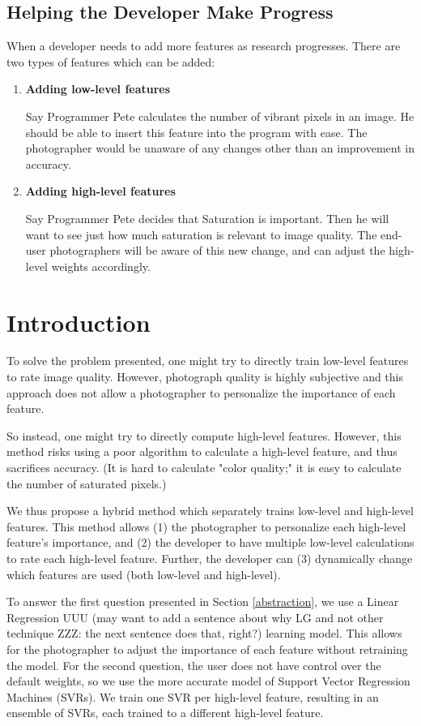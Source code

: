 \documentclass[11pt,letter]{article}
\begin{document}
\subsection{Helping the Developer Make Progress}
\label{easeofprogramming}
When a developer needs to add more features as research progresses. There are two types of features which can be added:
\begin{enumerate}
\item \textbf{Adding low-level features}

Say Programmer Pete calculates the number of vibrant pixels in an image. He should be able to insert this feature into the program with ease. The photographer would be unaware of any changes other than an improvement in accuracy.

\item \textbf{Adding high-level features}

Say Programmer Pete decides that Saturation is important. Then he will want to see just how much saturation is relevant to image quality. The end-user photographers will be aware of this new change, and can adjust the high-level weights accordingly.
\end{enumerate}

\section{Introduction}
To solve the problem presented, one might try to directly train low-level features to rate image quality. However, photograph quality is highly subjective and this approach does not allow a photographer to personalize the importance of each feature.

So instead, one might try to directly compute high-level features. However, this method risks using a poor algorithm to calculate a high-level feature, and thus sacrifices accuracy. (It is hard to calculate "color quality;" it is easy to calculate the number of saturated pixels.)

We thus propose a hybrid method which separately trains low-level and high-level features. This method allows (1) the photographer to personalize each high-level feature's importance, and (2) the developer to have multiple low-level calculations to rate each high-level feature. Further, the developer can (3) dynamically change which features are used (both low-level and high-level).

To answer the first question presented in Section \ref{abstraction}, we use a Linear Regression UUU (may want to add a sentence about why LG and not other technique ZZZ: the next sentence does that, right?) learning model. This allows for the photographer to adjust the importance of each feature without retraining the model. For the second question, the user does not have control over the default weights, so we use the more accurate model of Support Vector Regression Machines (SVRs)\cite{springerlink:10.1023/B:STCO.0000035301.49549.88}. We train one SVR per high-level feature, resulting in an ensemble of SVRs, each trained to a different high-level feature.
\end{document}
